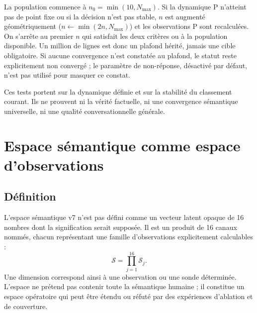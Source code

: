 \documentclass[11pt,a4paper]{report}
\begin{document}
La population commence à $n_0=\min(10,N_{\max})$. Si la dynamique P n'atteint pas de point fixe ou si la décision n'est pas stable, $n$ est augmenté géométriquement ($n\leftarrow\min(2n,N_{\max})$) et les observations P sont recalculées. On s'arrête au premier $n$ qui satisfait les deux critères ou à la population disponible. Un million de lignes est donc un plafond hérité, jamais une cible obligatoire. Si aucune convergence n'est constatée au plafond, le statut reste explicitement non convergé ; le paramètre de non-réponse, désactivé par défaut, n'est pas utilisé pour masquer ce constat.

Ces tests portent sur la dynamique définie et sur la stabilité du classement courant. Ils ne prouvent ni la vérité factuelle, ni une convergence sémantique universelle, ni une qualité conversationnelle générale.

\chapter{Espace sémantique comme espace d'observations}
\section{Définition}
L'espace sémantique v7 n'est pas défini comme un vecteur latent opaque de 16 nombres dont la signification serait supposée. Il est un produit de 16 canaux nommés, chacun représentant une famille d'observations explicitement calculables :
\[
\mathcal{S}=\prod_{j=1}^{16}\mathcal{S}_j.
\]
Une dimension correspond ainsi à une observation ou une sonde déterminée. L'espace ne prétend pas contenir toute la sémantique humaine ; il constitue un espace opératoire qui peut être étendu ou réfuté par des expériences d'ablation et de couverture.
\end{document}
